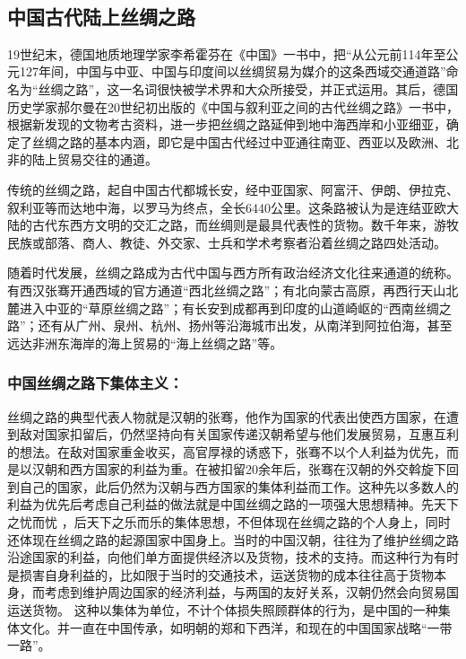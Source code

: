 　
\subsection{中国古代陆上丝绸之路}

19世纪末，德国地质地理学家李希霍芬在《中国》一书中，把“从公元前114年至公元127年间，中国与中亚、中国与印度间以丝绸贸易为媒介的这条西域交通道路”命名为“丝绸之路”，这一名词很快被学术界和大众所接受，并正式运用。其后，德国历史学家郝尔曼在20世纪初出版的《中国与叙利亚之间的古代丝绸之路》一书中，根据新发现的文物考古资料，进一步把丝绸之路延伸到地中海西岸和小亚细亚，确定了丝绸之路的基本内涵，即它是中国古代经过中亚通往南亚、西亚以及欧洲、北非的陆上贸易交往的通道。

传统的丝绸之路，起自中国古代都城长安，经中亚国家、阿富汗、伊朗、伊拉克、叙利亚等而达地中海，以罗马为终点，全长6440公里。这条路被认为是连结亚欧大陆的古代东西方文明的交汇之路，而丝绸则是最具代表性的货物。数千年来，游牧民族或部落、商人、教徒、外交家、士兵和学术考察者沿着丝绸之路四处活动。

随着时代发展，丝绸之路成为古代中国与西方所有政治经济文化往来通道的统称。有西汉张骞开通西域的官方通道“西北丝绸之路”；有北向蒙古高原，再西行天山北麓进入中亚的“草原丝绸之路”；有长安到成都再到印度的山道崎岖的“西南丝绸之路”；还有从广州、泉州、杭州、扬州等沿海城市出发，从南洋到阿拉伯海，甚至远达非洲东海岸的海上贸易的“海上丝绸之路”等。
　　
\subsubsection{中国丝绸之路下集体主义：}

丝绸之路的典型代表人物就是汉朝的张骞，他作为国家的代表出使西方国家，在遭到敌对国家扣留后，仍然坚持向有关国家传递汉朝希望与他们发展贸易，互惠互利的想法。在敌对国家重金收买，高官厚禄的诱惑下，张骞不以个人利益为优先，而是以汉朝和西方国家的利益为重。在被扣留20余年后，张骞在汉朝的外交斡旋下回到自己的国家，此后仍然为汉朝与西方国家的集体利益而工作。这种先以多数人的利益为优先后考虑自己利益的做法就是中国丝绸之路的一项强大思想精神。先天下之忧而忧 ，后天下之乐而乐的集体思想，不但体现在丝绸之路的个人身上，同时还体现在丝绸之路的起源国家中国身上。当时的中国汉朝，往往为了维护丝绸之路沿途国家的利益，向他们单方面提供经济以及货物，技术的支持。而这种行为有时是损害自身利益的，比如限于当时的交通技术，运送货物的成本往往高于货物本身，而考虑到维护周边国家的经济利益，与两国的友好关系，汉朝仍然会向贸易国运送货物。
这种以集体为单位，不计个体损失照顾群体的行为，是中国的一种集体文化。并一直在中国传承，如明朝的郑和下西洋，和现在的中国国家战略“一带一路”。